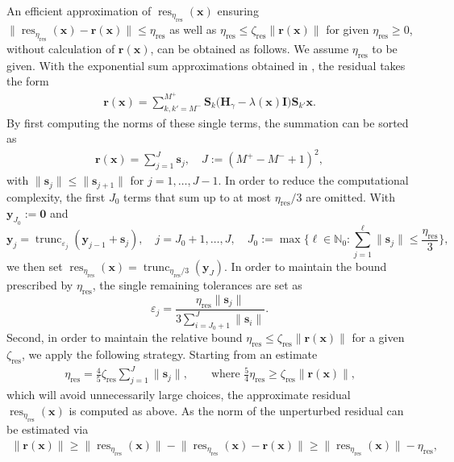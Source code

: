 \documentclass[a4paper,11pt,oneside]{amsart}
\providecommand{\norm}[1]{\lVert#1\rVert}
\theoremstyle{definition}
\theoremstyle{remark}
\newcommand{\N}{\mathbb{N}}
\newcommand{\ten}[1]{\boldsymbol{#1}}
\newcommand{\etares}{\eta_{\mathrm{res}}}
\newcommand{\zetares}{\zeta_{\mathrm{res}}}
\numberwithin{equation}{section}
\numberwithin{theorem}{section}
\begin{document}
An efficient approximation of $\operatorname{res}_{\etares}(\ten x)$ ensuring $\norm{ \operatorname{res}_{\etares}(\ten x) - \ten r(\ten x) } \leq \etares$ as well as $\etares \leq \zetares \| \ten r(\ten x) \|$ for given $\etares \geq 0$, without calculation of $\ten r(\ten x)$, can be obtained as follows. 
We assume $\etares$ to be given. With the exponential sum approximations obtained in , the residual takes the form
\begin{align*}
 \ten r(\ten x) = \sum_{k,k' = M^-}^{M^+} \ten S_k \bigl( \ten H_\gamma - \lambda(\ten x) \ten I \bigr) \ten S_{k'} \ten x.
\end{align*}
By first computing the norms of these single terms, the summation can be sorted as
\begin{align*}
 \ten r(\ten x) = \sum_{j = 1}^{J} \ten s_j, \quad J := (M^+ - M^- + 1)^2,
\end{align*}
with $\|\ten s_j\| \leq \|\ten s_{j+1}\|$ for $j = 1,\ldots,J-1$. In order to reduce the computational complexity, the first $J_0$ terms that sum up to at most $\etares/3$ are omitted. With $\ten y_{J_0} := \ten 0$ and
\[
		\ten y_{j} = \operatorname{trunc}_{\varepsilon_j} (\ten y_{j-1} + \ten s_j), \quad j = J_0 + 1, \ldots, J, \quad J_0 := \max \biggl\{ \ell \in \N_0 \colon \sum_{j = 1}^{\ell} \|\ten s_j\| \leq \frac{\etares}3 \biggr\},
		\]
we then set $\operatorname{res}_{\etares}(\ten x) = \operatorname{trunc}_{\etares/3} (\ten y_J)$. In order to maintain the bound prescribed by $\etares$, the single remaining tolerances are set as
\[
   \varepsilon_j = \frac{ \etares  \norm{ \ten s_j }}{ 3 \sum_{i = J_0 + 1}^J \norm{ \ten s_i } }.
\]
Second, in order to maintain the relative bound $\etares  \leq \zetares \| \ten r(\ten x) \|$ for a given $\zetares$, we apply the following strategy.
Starting from an estimate
\begin{align}\label{startetar}
 \etares = \frac{4}{5}  \zetares \sum_{j = 1}^{J} \|\ten s_j\|, \qquad \text{where $\frac{5}{4} \etares \geq \zetares \| \ten r(\ten x) \|$,}
\end{align}
which will avoid unnecessarily large choices, the approximate residual $\operatorname{res}_{\etares}(\ten x)$ is computed as above.
As the norm of the unperturbed residual can be estimated via
\begin{align}\label{rnormestimate}
  \| \ten r(\ten x) \| \geq  \norm{ \operatorname{res}_{\etares}(\ten x)}  - \norm{ \operatorname{res}_{\etares}(\ten x) - \ten{r}(\ten x) }  \geq   \norm{ \operatorname{res}_{\etares}(\ten x)} - \etares, 
\end{align}
\end{document}
